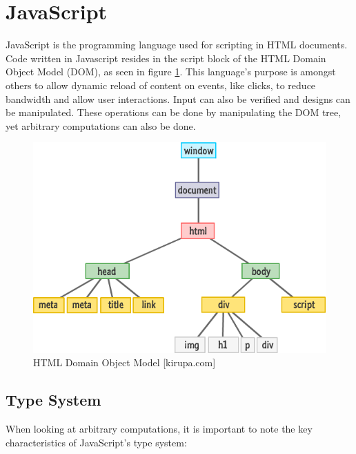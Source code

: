 \section{JavaScript} \label{chapter_javascript}

JavaScript is the programming language used for scripting in HTML documents. Code written in Javascript resides in the script block of the HTML Domain Object Model (DOM), as seen in figure \ref{fig:htmldom}. This language's purpose is amongst others to allow dynamic reload of content on events, like clicks, to reduce bandwidth and allow user interactions. Input can also be verified and designs can be manipulated. These operations can be done by manipulating the DOM tree, yet arbitrary computations can also be done.

\begin{figure}[htp]
  \begin{center}
    \includegraphics[width=0.9\columnwidth]{resources/html_dom.png}
  \end{center}
  \caption{HTML Domain Object Model [kirupa.com]}
  \label{fig:htmldom}
\end{figure}


\subsection{Type System}

When looking at arbitrary computations, it is important to note the key characteristics of JavaScript's type system:


